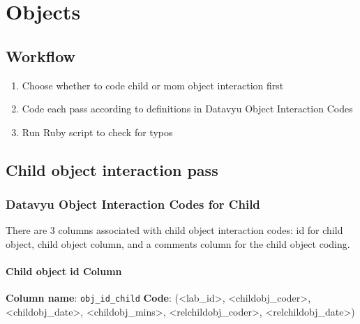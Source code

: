 \documentclass[
]{book}
\providecommand{\tightlist}{%
  \setlength{\itemsep}{0pt}\setlength{\parskip}{0pt}}
\begin{document}
\hypertarget{objects}{%
\chapter{Objects}\label{objects}}

\hypertarget{workflow-3}{%
\section{Workflow}\label{workflow-3}}

\begin{enumerate}
\def\labelenumi{\arabic{enumi}.}
\tightlist
\item
  Choose whether to code child or mom object interaction first
\item
  Code each pass according to definitions in Datavyu Object Interaction Codes
\item
  Run Ruby script to check for typos
\end{enumerate}

\hypertarget{child-object-interaction-pass}{%
\section{Child object interaction pass}\label{child-object-interaction-pass}}

\hypertarget{datavyu-object-interaction-codes-for-child}{%
\subsection{Datavyu Object Interaction Codes for Child}\label{datavyu-object-interaction-codes-for-child}}

There are 3 columns associated with child object interaction codes: id for child object, child object column, and a comments column for the child object coding.

\hypertarget{child-object-id-column}{%
\subsubsection*{Child object id Column}\label{child-object-id-column}}

\textbf{Column name}: \texttt{obj\_id\_child}
\textbf{Code}: (\textless lab\_id\textgreater, \textless childobj\_coder\textgreater, \textless childobj\_date\textgreater, \textless childobj\_mins\textgreater, \textless relchildobj\_coder\textgreater, \textless relchildobj\_date\textgreater)
\end{document}
